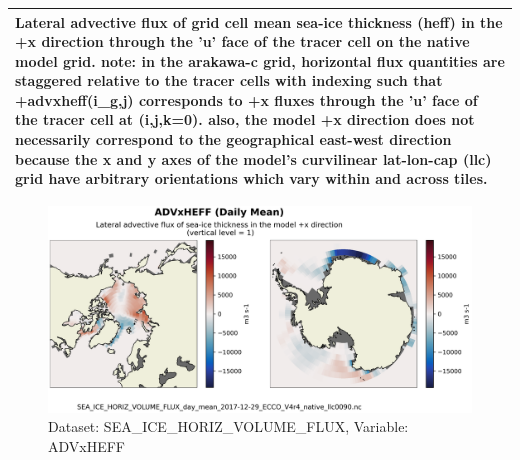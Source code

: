 \begin{longtable}{|m{}|m{}|m{}|m{}|}
\multicolumn{4}{|p{1\textwidth}|}{\footnotesize{{Lateral advective flux of grid cell mean sea-ice thickness (heff) in the +x direction through the 'u' face of the tracer cell on the native model grid. note: in the arakawa-c grid, horizontal flux quantities are staggered relative to the tracer cells with indexing such that +advxheff(i\_g,j) corresponds to +x fluxes through the 'u' face of the tracer cell at (i,j,k=0). also, the model +x direction does not necessarily correspond to the geographical east-west direction because the x and y axes of the model's curvilinear lat-lon-cap (llc) grid have arbitrary orientations which vary within and across tiles.}}} \\ \hline
\end{longtable}

\begin{figure}[H]
\centering
\includegraphics[scale=0.55]{../images/plots/v4r4/native_plots/Sea-Ice_and_Snow_Horizontal_Volume_Fluxes/ADVxHEFF.png}
\caption{Dataset: SEA\_ICE\_HORIZ\_VOLUME\_FLUX, Variable: ADVxHEFF}
\label{tab:table-SEA_ICE_HORIZ_VOLUME_FLUX_ADVxHEFF-Plot}
\end{figure}
\newpage
\pagebreak
